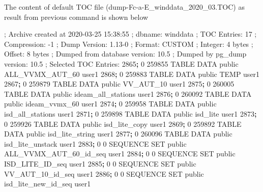 \documentclass[12pt,twoside]{reedthesis}
\newenvironment{Shaded}{\begin{snugshade}}{\end{snugshade}}
\newcommand{\ExtensionTok}[1]{#1}
\newcommand{\KeywordTok}[1]{\textcolor[rgb]{0.13,0.29,0.53}{\textbf{#1}}}
\newcommand{\NormalTok}[1]{#1}
\begin{document}
The content of default TOC file (dump-Fc-a-E\_winddata\_2020\_03.TOC) as result from previous command is shown below

\scriptsize

\vspace{0.4cm}
\begin{Shaded}
\begin{Highlighting}[]
\NormalTok{      ; }\ExtensionTok{Archive}\NormalTok{ created at 2020-03-25 15:38:55}
\NormalTok{      ;     }\ExtensionTok{dbname}\NormalTok{: winddata}
\NormalTok{      ;     }\ExtensionTok{TOC}\NormalTok{ Entries: 17}
\NormalTok{      ;     }\ExtensionTok{Compression}\NormalTok{: -1}
\NormalTok{      ;     }\ExtensionTok{Dump}\NormalTok{ Version: 1.13-0}
\NormalTok{      ;     }\ExtensionTok{Format}\NormalTok{: CUSTOM}
\NormalTok{      ;     }\ExtensionTok{Integer}\NormalTok{: 4 bytes}
\NormalTok{      ;     }\ExtensionTok{Offset}\NormalTok{: 8 bytes}
\NormalTok{      ;     }\ExtensionTok{Dumped}\NormalTok{ from database version: 10.5}
\NormalTok{      ;     }\ExtensionTok{Dumped}\NormalTok{ by pg_dump version: 10.5}
\NormalTok{      ; }\ExtensionTok{Selected}\NormalTok{ TOC Entries:}
      \ExtensionTok{2865}\KeywordTok{;} \ExtensionTok{0}\NormalTok{ 259855 TABLE DATA public ALL_VVMX_AUT_60 user1}
      \ExtensionTok{2868}\KeywordTok{;} \ExtensionTok{0}\NormalTok{ 259883 TABLE DATA public TEMP user1}
      \ExtensionTok{2867}\KeywordTok{;} \ExtensionTok{0}\NormalTok{ 259879 TABLE DATA public VV_AUT_10 user1}
      \ExtensionTok{2875}\KeywordTok{;} \ExtensionTok{0}\NormalTok{ 260005 TABLE DATA public ideam_all_stations user1}
      \ExtensionTok{2876}\KeywordTok{;} \ExtensionTok{0}\NormalTok{ 260092 TABLE DATA public ideam_vvmx_60 user1}
      \ExtensionTok{2874}\KeywordTok{;} \ExtensionTok{0}\NormalTok{ 259958 TABLE DATA public isd_all_stations user1}
      \ExtensionTok{2871}\KeywordTok{;} \ExtensionTok{0}\NormalTok{ 259898 TABLE DATA public isd_lite user1}
      \ExtensionTok{2873}\KeywordTok{;} \ExtensionTok{0}\NormalTok{ 259926 TABLE DATA public isd_lite_copy user1}
      \ExtensionTok{2869}\KeywordTok{;} \ExtensionTok{0}\NormalTok{ 259892 TABLE DATA public isd_lite_string user1}
      \ExtensionTok{2877}\KeywordTok{;} \ExtensionTok{0}\NormalTok{ 260096 TABLE DATA public isd_lite_unstack user1}
      \ExtensionTok{2883}\KeywordTok{;} \ExtensionTok{0}\NormalTok{ 0 SEQUENCE SET public ALL_VVMX_AUT_60_id_seq user1}
      \ExtensionTok{2884}\KeywordTok{;} \ExtensionTok{0}\NormalTok{ 0 SEQUENCE SET public ISD_LITE_ID_seq user1}
      \ExtensionTok{2885}\KeywordTok{;} \ExtensionTok{0}\NormalTok{ 0 SEQUENCE SET public VV_AUT_10_id_seq user1}
      \ExtensionTok{2886}\KeywordTok{;} \ExtensionTok{0}\NormalTok{ 0 SEQUENCE SET public isd_lite_new_id_seq user1}
\end{Highlighting}
\end{Shaded}
\normalsize
\end{document}
